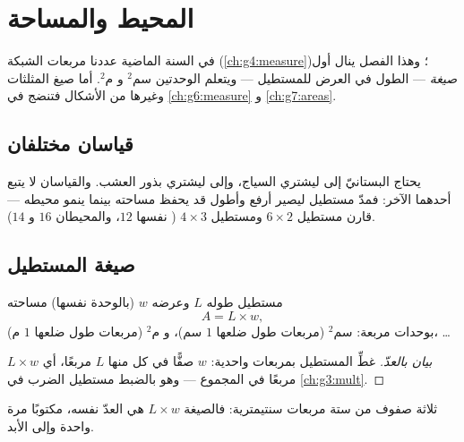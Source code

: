\chapter{المحيط والمساحة}\label{ch:g5:areas}

في السنة الماضية عددنا مربعات الشبكة (\cref{ch:g4:measure})؛ وهذا
الفصل ينال أول \emph{صيغة}  --- الطول في العرض
للمستطيل --- ويتعلم الوحدتين سم$^2$ و م$^2$. أما صيغ
المثلثات وغيرها من الأشكال فتنضج في \cref{ch:g6:measure} و
\cref{ch:g7:areas}.

\section{قياسان مختلفان}

\begin{example}\label{ex:g5:areas:contrast}
يحتاج البستانيّ إلى \emph{} ليشتري السياج، وإلى \emph{}
ليشتري بذور العشب. والقياسان لا يتبع أحدهما الآخر: فمدّ
مستطيل ليصير أرفع وأطول قد يحفظ مساحته بينما ينمو
محيطه --- قارن مستطيل $6 \times 2$ ومستطيل $4 \times 3$
( نفسها $12$، والمحيطان $16$ و $14$).
\end{example}

\section{صيغة المستطيل}

\begin{proposition}\label{prop:g5:areas:rectangle}
مستطيل طوله $L$ وعرضه $w$ (بالوحدة نفسها) مساحته
\[
A = L \times w ,
\]
بوحدات مربعة: سم$^2$ (مربعات طول ضلعها $1$ سم)، و م$^2$ (مربعات
طول ضلعها $1$ م)، \dots
\end{proposition}

\begin{proof}[بيان بالعدّ]
غطِّ المستطيل بمربعات واحدية: $w$ صفًّا في كل منها $L$ مربعًا،
أي $L \times w$ مربعًا في المجموع --- وهو بالضبط مستطيل
الضرب في \cref{ch:g3:mult}.
\end{proof}

\begin{omfigure}

{\small ثلاثة صفوف من ستة مربعات سنتيمترية: فالصيغة
$L \times w$ هي العدّ نفسه، مكتوبًا مرة واحدة وإلى الأبد.}
\end{omfigure}

